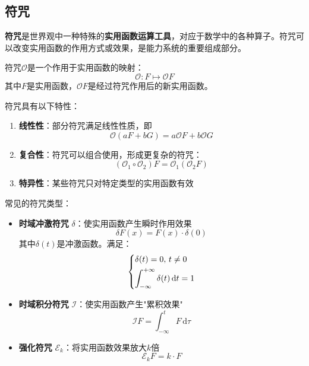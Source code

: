 \documentclass[lang=cn,newtx,10pt,scheme=chinese]{elegantbook}
\newcommand{\md}{\mathrm{d}}
\begin{document}
\subsection{符咒}
\textbf{符咒}是世界观中一种特殊的\textbf{实用函数运算工具}，对应于数学中的各种算子。符咒可以改变实用函数的作用方式或效果，是能力系统的重要组成部分。

\begin{definition}[符咒]
    符咒$\mathcal{O}$是一个作用于实用函数的映射：
    \[
        \mathcal{O}: F \mapsto \mathcal{O}F
    \]
    其中$F$是实用函数，$\mathcal{O}F$是经过符咒作用后的新实用函数。
\end{definition}

符咒具有以下特性：
\begin{enumerate}
    \item \textbf{线性性}：部分符咒满足线性性质，即
          \[
              \mathcal{O}(aF + bG) = a\mathcal{O}F + b\mathcal{O}G
          \]
    \item \textbf{复合性}：符咒可以组合使用，形成更复杂的符咒：
          \[
              (\mathcal{O}_1 \circ \mathcal{O}_2)F = \mathcal{O}_1(\mathcal{O}_2F)
          \]
    \item \textbf{特异性}：某些符咒只对特定类型的实用函数有效
\end{enumerate}

常见的符咒类型：
\begin{itemize}
    \item \textbf{时域冲激符咒} $\delta$：使实用函数产生瞬时作用效果
          \[
              \delta F(x) = F(x)\cdot \delta(0)
          \]
          其中\(\delta(t)\)是冲激函数。满足：
          \[
              \begin{dcases}
                  \delta(t) =0,\, t \neq 0                   \\
                  \int_{-\infty}^{+\infty}\delta(t)\,\md t=1 \\
              \end{dcases}
          \]
    \item \textbf{时域积分符咒} $\mathcal{I}$：使实用函数产生"累积效果"
          \[
              \mathcal{I}F = \int_{-\infty}^t F\,\md \tau
          \]
    \item \textbf{强化符咒} $\mathcal{E}_k$：将实用函数效果放大$k$倍
          \[
              \mathcal{E}_k F = k \cdot F
          \]
\end{itemize}
\end{document}
